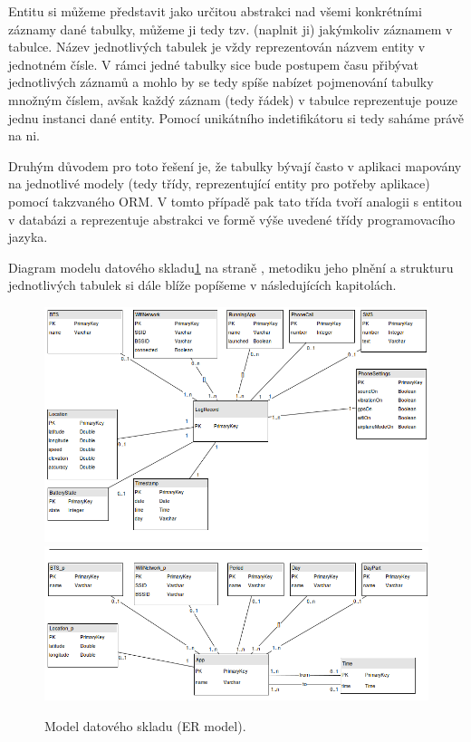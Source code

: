 \documentclass[thesis=M,czech]{FITthesis}[2012/06/26]
\begin{document}
Entitu si můžeme představit jako určitou abstrakci nad všemi konkrétními záznamy dané tabulky, můžeme ji tedy tzv.  (naplnit ji) jakýmkoliv záznamem v tabulce. Název jednotlivých tabulek je vždy reprezentován názvem entity v jednotném čísle. V rámci jedné tabulky sice bude postupem času přibývat jednotlivých záznamů a mohlo by se tedy spíše nabízet pojmenování tabulky množným číslem, avšak každý záznam (tedy řádek) v tabulce reprezentuje pouze jednu instanci dané entity. Pomocí unikátního indetifikátoru si tedy saháme právě na ni.

Druhým důvodem pro toto řešení je, že tabulky bývají často v aplikaci mapovány na jednotlivé modely (tedy třídy, reprezentující entity pro potřeby aplikace) pomocí takzvaného ORM. V tomto případě pak tato třída tvoří analogii s entitou v databázi a reprezentuje abstrakci ve formě výše uvedené třídy programovacího jazyka.

Diagram modelu datového skladu\ref{fig:er_model} na straně \pageref{fig:er_model}, metodiku jeho plnění a strukturu jednotlivých tabulek si dále blíže popíšeme v následujících kapitolách.

\begin{figure}\centering
	\includegraphics[width=1\textwidth]{figures/er_model1}
	\includegraphics[width=1\textwidth]{figures/er_model2}
	\caption{Model datového skladu (ER model).}
	\label{fig:er_model}
\end{figure}
\end{document}
